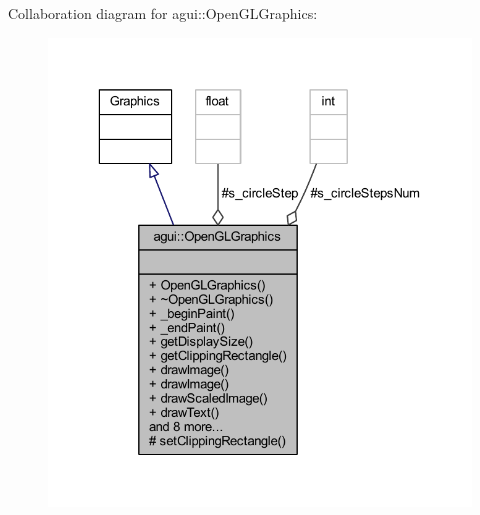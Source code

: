 Collaboration diagram for agui\+:\+:Open\+G\+L\+Graphics\+:\nopagebreak
\begin{figure}[H]
\begin{center}
\leavevmode
\includegraphics[width=329pt]{classagui_1_1_open_g_l_graphics__coll__graph}
\end{center}
\end{figure}
